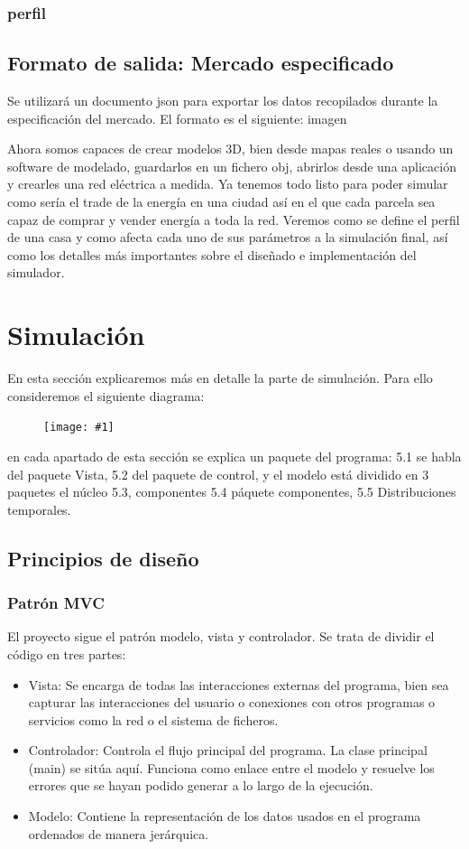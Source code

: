 \documentclass[12pt,a4paper,openright,oneside]{article}
\newcommand{\includeImage}[1]
{
	\begin{figure}[htb]
	\begin{center}
	\texttt{[image: \#1]}
	\end{center}
	\end{figure}
}
\numberwithin{equation}{section}
\theoremstyle{definition}
\begin{document}
\subsubsection{perfil}


\subsection{Formato de salida: Mercado especificado}
Se utilizará un documento json para exportar los datos recopilados durante la especificación del mercado. El formato es el siguiente:
imagen


Ahora somos capaces de crear modelos 3D, bien desde mapas reales o usando un software de modelado, guardarlos en un fichero obj, abrirlos desde una aplicación y crearles una red eléctrica a medida. Ya tenemos todo listo para poder simular como sería el trade de la energía en una ciudad así en el que cada parcela sea capaz de comprar y vender energía a toda la red. Veremos como se define el perfil de una casa y como afecta cada uno de sus parámetros a la simulación final, así como los detalles más importantes sobre el diseñado e implementación del simulador.

\newpage




\section{Simulación}
En esta sección explicaremos más en detalle la parte de simulación. Para ello consideremos el siguiente diagrama:
\includeImage{simulator.png}
en cada apartado de esta sección se explica un paquete del programa: 5.1 se habla del paquete Vista, 5.2 del paquete de control, y el modelo está dividido en 3 paquetes el núcleo 5.3, componentes 5.4 páquete componentes, 5.5 Distribuciones temporales.

\subsection{Principios de diseño}
\subsubsection{Patrón MVC}

El proyecto sigue el patrón modelo, vista y controlador. Se trata de dividir el código en tres partes:
\begin{itemize}
\item Vista: Se encarga de todas las interacciones externas del programa, bien sea capturar las interacciones del usuario o conexiones con otros programas o servicios como la red o el sistema de ficheros.
\item Controlador: Controla el flujo principal del programa. La clase principal (main) se sitúa aquí. Funciona como enlace entre el modelo y resuelve los errores que se hayan podido generar a lo largo de la ejecución.
\item Modelo: Contiene la representación de los datos usados en el programa ordenados de manera jerárquica.
\end{itemize}
\end{document}
